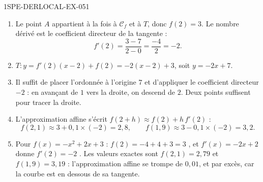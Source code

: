 \begin{corrige}{1SPE-DERLOCAL-EX-051}
\begin{enumerate}
\item Le point $A$ appartient à la fois à $\mathcal{C}_f$ et à $T$, donc
  $f(2) = 3$. Le nombre dérivé est le coefficient directeur de la tangente :
  \[
    f'(2) = \frac{3 - 7}{2 - 0} = \frac{-4}{2} = -2 .
  \]

\item $T : y = f'(2)(x-2) + f(2) = -2(x-2) + 3$, soit
  $y = -2x + 7$.

\item Il suffit de placer l'ordonnée à l'origine $7$ et d'appliquer le
  coefficient directeur $-2$ : en avançant de $1$ vers la droite, on descend
  de $2$. Deux points suffisent pour tracer la droite.

\item L'approximation affine s'écrit $f(2+h) \approx f(2) + h\,f'(2)$ :
  \[
    f(2{,}1) \approx 3 + 0{,}1\times(-2) = 2{,}8,
    \qquad
    f(1{,}9) \approx 3 - 0{,}1\times(-2) = 3{,}2 .
  \]

\item Pour $f(x) = -x^2 + 2x + 3$ : $f(2) = -4 + 4 + 3 = 3$ \checkmark, et
  $f'(x) = -2x + 2$ donne $f'(2) = -2$ \checkmark. Les valeurs exactes sont
  $f(2{,}1) = 2{,}79$ et $f(1{,}9) = 3{,}19$ : l'approximation affine se
  trompe de $0{,}01$, et par excès, car la courbe est en dessous de sa
  tangente.
\end{enumerate}
\end{corrige}
